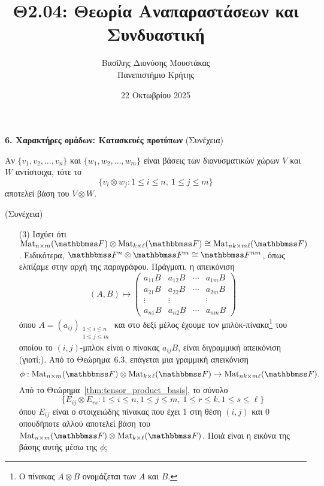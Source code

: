 \documentclass[12pt,a4paper,reqno]{amsart}
\title{Θ2.04: Θεωρία Αναπαραστάσεων και Συνδυαστική}
\author[Β.~Δ. Μουστακας]{Βασίλης Διονύσης Μουστάκας \\ Πανεπιστήμιο Κρήτης}
\date{22 Οκτωβρίου 2025}
\newcommand{\defn}[1]{{\color{mylightblue}{#1}}}
\begin{document}
\begingroup
\def\uppercasenonmath#1{} %
\let\MakeUppercase\relax %
\maketitle
\endgroup

\setcounter{section}{6}
\setcounter{theorem}{4}
\begin{center}
    \textbf{6. Χαρακτήρες ομάδων: Κατασκευές προτύπων
} (Συνέχεια)
\end{center}

\begin{theorem}
    \label{thm:tensor_product_basis}
    Αν $\{v_1, v_2, \dots, v_n\}$ και $\{w_1, w_2, \dots, w_m\}$ είναι βάσεις των διανυσματικών χώρων $V$ και $W$ αντίστοιχα, τότε το 
    \[
    \{v_i \otimes w_j : 1 \le i \le n, \ 1 \le j \le m\}
    \]
    αποτελεί βάση του $V \otimes W$.
\end{theorem}

\begin{example_cont}{\rm(Συνέχεια)}
    \begin{itemize}
        \item[(3)] Ισχύει ότι $\rmMat_{n\times{m}}(\FF) \otimes \rmMat_{k\times{\ell}}(\FF) \cong \rmMat_{nk\times{m\ell}}(\FF)$. Ειδικότερα, $\FF^n \otimes \FF^m \cong \FF^{nm}$, όπως ελπίζαμε στην αρχή της παραγράφου. Πράγματι, η απεικόνιση 
        \[
        (Α,Β) \mapsto
        \begin{pmatrix}
            a_{11}B & a_{12}B & \cdots & a_{1m}B \\
            a_{21}B & a_{22}B & \cdots & a_{2m}B \\
            \vdots & \vdots &        & \vdots \\
            a_{n1}B & a_{n2}B & \cdots & a_{nm}B
        \end{pmatrix} 
        \]
        όπου $A = (a_{ij})_{\substack{1 \le i \le n\\ 1 \le j \le m}}$ και στο δεξί μέλος έχουμε τον μπλόκ-πίνακα\footnote{Ο πίνακας $A\otimes{B}$ ονομάζεται \defn{γινόμενο Kronecker} των $Α$ και $B$.} του οποίου το $(i,j)$-μπλοκ είναι ο πίνακας $a_{ij}B$, είναι διγραμμική απεικόνιση (γιατί;). Από το Θεώρημα~6.3, επάγεται μια γραμμική απεικόνιση 
        \[
        \phi : \rmMat_{n\times{m}}(\FF) \otimes \rmMat_{k\times{\ell}}(\FF) \to \rmMat_{nk\times{m\ell}}(\FF). 
        \]
        Από το Θεώρημα~\ref{thm:tensor_product_basis}, το σύνολο 
        \[
        \{E_{ij} \otimes E_{rs} : 1\le{i}\le{n}, 1 \le j \le m, \ 1 \le r \le k, 1 \le s \le \ell\}
        \]
        όπου $E_{ij}$ είναι ο στοιχειώδης πίνακας που έχει 1 στη θέση $(i,j)$ και 0 οπουδήποτε αλλού
        αποτελεί βάση του $\rmMat_{n\times{m}}(\FF) \otimes \rmMat_{k\times{\ell}}(\FF)$. Ποιά είναι η εικόνα της βάσης αυτής μέσω της $\phi$;
    \end{itemize}
\end{example_cont}
\end{document}

